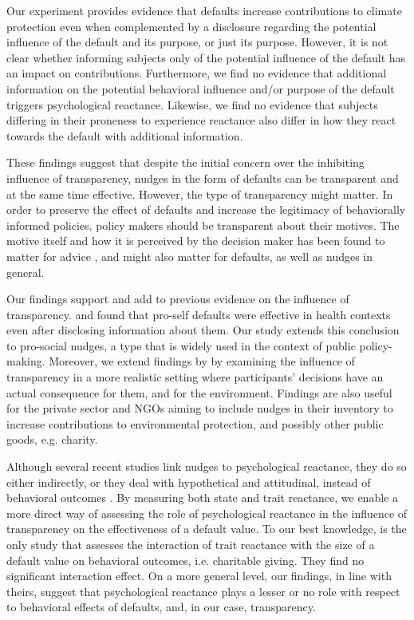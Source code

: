 \documentclass[review, authoryear,12pt]{elsarticle}
\begin{document}
Our experiment provides evidence that defaults increase contributions to climate protection even when complemented by a disclosure regarding the potential influence of the default and its purpose, or just its purpose. However, it is not clear whether informing subjects only of the potential influence of the default has an impact on contributions. Furthermore, we find no evidence that additional information on the potential behavioral influence and/or purpose of the default triggers psychological reactance. Likewise, we find no evidence that subjects differing in their proneness to experience reactance also differ in how they react towards the default with additional information.

These findings suggest that despite the initial concern over the inhibiting influence of transparency, nudges in the form of defaults can be transparent and at the same time effective. However, the type of transparency might matter. In order to preserve the effect of defaults and increase the legitimacy of behaviorally informed policies, policy makers should be transparent about their motives. The motive itself and how it is perceived by the decision maker has been found to matter for advice \citep{Kuang.2007}, and might also matter for defaults, as well as nudges in general.

Our findings support and add to previous evidence on the influence of transparency. \cite{Loewenstein.2015} and \cite{Kroese.2016} found that pro-self defaults were effective in health contexts even after disclosing information about them. Our study extends this conclusion to pro-social nudges, a type that is widely used in the context of public policy-making. Moreover, we extend findings by \cite{Steffel.2016} by examining the influence of transparency in a more realistic setting where participants' decisions have an actual consequence for them, and for the environment. Findings are also useful for the private sector and NGOs aiming to include nudges in their inventory to increase contributions to environmental protection, and possibly other public goods, e.g. charity.

Although several recent studies link nudges to psychological reactance, they do so either indirectly, or they deal with hypothetical and attitudinal, instead of behavioral outcomes \citep{Haggag.2014, Arad.2015, Loewenstein.2015, Hedlin.2016}. By measuring both state and trait reactance, we enable a more direct way of assessing the role of psychological reactance in the influence of transparency on the effectiveness of a default value. To our best knowledge, \cite{Goswami.2016} is the only study that assesses the interaction of trait reactance with the size of a default value on behavioral outcomes, i.e. charitable giving. They find no significant interaction effect. On a more general level, our findings, in line with theirs, suggest that psychological reactance plays a lesser or no role with respect to behavioral effects of defaults, and, in our case, transparency.
\end{document}
